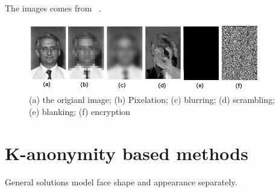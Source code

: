 	The images comes from ~\cite{dufaux08}.
	\begin{figure}[!htb]
		  \centering
		  \includegraphics[width=0.9\textwidth]{figure/adhoc.png} 
		  \caption{(a) the origianl image; (b) Pixelation; (c) blurring; (d) scrambling; (e) blanking; (f) encryption}
		  \label{expression}
	\end{figure}


\section{K-anonymity based methods}

	General solutions model face shape and appearance separately. 